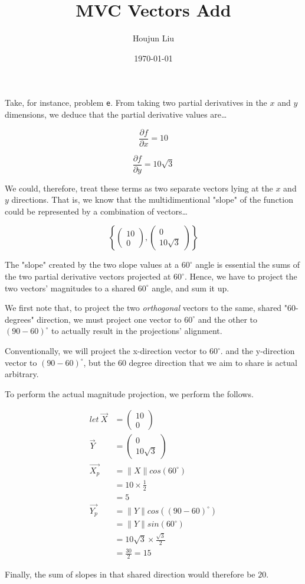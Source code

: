 \documentclass[letterpaper]{article}
\author{Houjun Liu}
\date{\today}
\title{MVC Vectors Add}
\renewcommand{\tableofcontents}{}
\begin{document}
\tableofcontents

Take, for instance, problem \texttt{e}. From taking two partial derivatives in the \(x\) and \(y\) dimensions, we deduce that the partial derivative values are\ldots{}

\begin{equation}
    \frac{\partial f}{\partial x} = 10 
\end{equation}

\begin{equation}
    \frac{\partial f}{\partial y} = 10 \sqrt{3}
\end{equation}

We could, therefore, treat these terms as two separate vectors lying at the \(x\) and \(y\) directions. That is, we know that the multidimentional "slope" of the function could be represented by a combination of vectors\ldots{}

\begin{equation}
\left\{\begin{pmatrix}10 \\ 0 \end{pmatrix},\begin{pmatrix}0 \\ 10\sqrt{3} \end{pmatrix} \right\}
\end{equation}

The "slope" created by the two slope values at a \(60^{\circ}\) angle is essential the sums of the two partial derivative vectors projected at \(60^{\circ}\). Hence, we have to project the two vectors' magnitudes to a shared \(60^{\circ}\) angle, and sum it up.

We first note that, to project the two \emph{orthogonal} vectors to the same, shared "60-degrees" direction, we must project one vector to \(60^{\circ}\) and the other to \((90-60)^{\circ}\) to actually result in the projections' alignment.

Conventionally, we will project the x-direction vector to \(60^{\circ}\). and the y-direction vector to \((90-60)^{\circ}\), but the 60 degree direction that we aim to share is actual arbitrary.

To perform the actual magnitude projection, we perform the follows.

\begin{align}
    let\ \vec{X} &= \begin{pmatrix}10\\0\end{pmatrix} \\
    \vec{Y} &= \begin{pmatrix}0\\10\sqrt{3}\end{pmatrix} \\
 \vec{X_p} &= \|X\|cos(60^{\circ}) \\ 
 &= 10 \times \frac{1}{2} \\
 &= 5 \\
 \vec{Y_p} &= \|Y\|cos((90-60)^{\circ}) \\
 &= \|Y\|sin(60^{\circ}) \\
 &= 10\sqrt{3}\times\frac{\sqrt{3}}{2} \\
 &= \frac{30}{2} = 15
\end{align}

Finally, the sum of slopes in that shared direction would therefore be \(20\).
\end{document}
